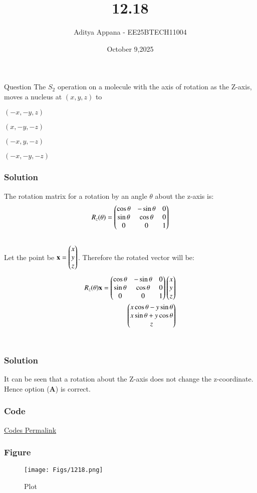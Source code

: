 \documentclass{beamer}
\title %
{12.18}
\date{October 9,2025}
\author %
{Aditya Appana - EE25BTECH11004}
\begin{document}
\frame{\titlepage}
\begin{frame}{Question}
The $S_2$ operation on a molecule with the axis of rotation as the Z-axis, moves a nucleus at $(x,y,z)$ to
\begin{enumerate}
\begin{multicols}{4}
    \item $(-x,-y,z)$
    \item $(x,-y,-z)$
    \item $(-x,y,-z)$
    \item $(-x,-y,-z)$
\end{multicols}
\end{enumerate}
\end{frame}



\begin{frame}[fragile]
    \frametitle{Solution}
The rotation matrix for a rotation by an angle $\theta$ about the z-axis is:
\begin{align}
R_z(\theta) = \begin{pmatrix}
\cos\theta & -\sin\theta & 0 \\
\sin\theta & \cos\theta & 0 \\
0 & 0 & 1\end{pmatrix}
\end{align}\\
Let the point be $\mathbf{x} = \begin{pmatrix}x\\y\\z\end{pmatrix}$. Therefore the rotated vector will be:
\begin{align}
 R_z(\theta)\mathbf{x} =
 \begin{pmatrix}\cos\theta & -\sin\theta & 0 \\\sin\theta & \cos\theta & 0 \\0 & 0 & 1\end{pmatrix}\begin{pmatrix}x\\y\\z\end{pmatrix}\\
 \begin{pmatrix}x\cos\theta - y\sin\theta \\ x\sin\theta +y\cos\theta \\ z\end{pmatrix}
\end{align}\\

\end{frame}
\begin{frame}[fragile]
    \frametitle{Solution}
It can be seen that a rotation about the Z-axis does not change the z-coordinate. Hence option (\textbf{A}) is correct.
\end{frame}


\begin{frame}[fragile]
    \frametitle{Code}
\href{https://github.com/AdityaAppana/ee1030-2025/tree/96431e23cc4d088e70368e400c3c60fbecfcaaa8/ee25btech11004/matgeo/12.18/Codes}{Codes Permalink}
\end{frame}

\begin{frame}[fragile]
    \frametitle{Figure}
\begin{figure}[H]
    \centering
    \texttt{[image: Figs/1218.png]}
    \caption{Plot}
    \label{fig:placeholder}
\end{figure}
\end{frame}
\end{document}
